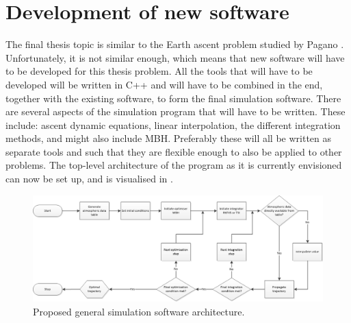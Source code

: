 %

\section{Development of new software}
\label{sec:develop_soft}
The final thesis topic is similar to the Earth ascent problem studied by Pagano \cite{pagano2010thesis}. Unfortunately, it is not similar enough, which means that new software will have to be developed for this thesis problem. All the tools that will have to be developed will be written in C++ and will have to be combined in the end, together with the existing software, to form the final simulation software. There are several aspects of the simulation program that will have to be written. These include: ascent dynamic equations, linear interpolation, the different integration methods, and might also include \ac{MBH}. Preferably these will all be written as separate tools and such that they are flexible enough to also be applied to other problems. The top-level architecture of the program as it is currently envisioned can now be set up, and is visualised in .

\begin{figure}[!ht]
\centering
\includegraphics[width=1.0\textwidth]{figures/software/general_soft_architecture.png}
\caption{Proposed general simulation software architecture.}
\label{fig:general_soft_architecture}
\end{figure}

